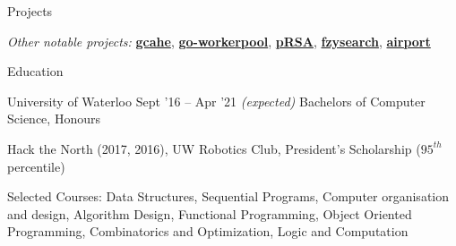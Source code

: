 \documentclass{resume} %
\begin{document}
\begin{rSection}{Projects}
  \begin{rMinisection}
    \item {\em Other notable projects:}
      \href{https://github.com/ridwanmsharif/cache}{\textbf{gcahe}},
      \href{https://github.com/ridwanmsharif/goworkerpool}{\textbf{go-workerpool}},
      \href{https://github.com/ridwanmsharif/prsa}{\textbf{pRSA}},
      \href{https://github.com/ridwanmsharif/fzysearch}{\textbf{fzysearch}},
      \href{https://github.com/ridwanmsharif/airport}{\textbf{airport}}
  \end{rMinisection}
\end{rSection}


\begin{rSection}{Education}
  \begin{rSubsection}{University of Waterloo}
		     {Sept '16 -- Apr '21 \em (expected)}
		     {Bachelors of Computer Science, Honours}
		     {}
    \item Hack the North (2017, 2016), UW Robotics Club, President's Scholarship
      ($95^{th}$ percentile)
    \item Selected Courses: Data Structures, Sequential Programs, Computer
      organisation and design, Algorithm Design, Functional Programming, Object
      Oriented Programming, Combinatorics and Optimization, Logic and
      Computation
  \end{rSubsection}
\end{rSection} 
\end{document}
